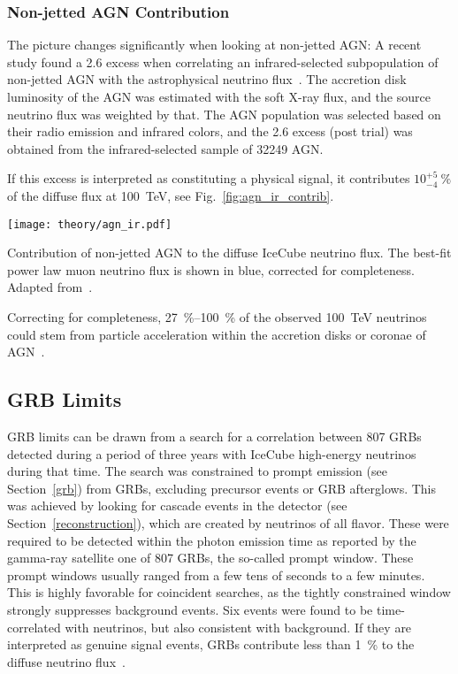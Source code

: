 \subsubsection{Non-jetted AGN Contribution}

The picture changes significantly when looking at non-jetted AGN: A recent study found a \SI{2.6}{\sigma} excess when correlating an infrared-selected subpopulation of non-jetted AGN with the astrophysical neutrino flux~. The accretion disk luminosity of the AGN was estimated with the soft X-ray flux, and the source neutrino flux was weighted by that. The AGN population was selected based on their radio emission and infrared colors, and the \SI{2.6}{\sigma} excess (post trial) was obtained from the infrared-selected sample of 32249 AGN.

If this excess is interpreted as constituting a physical signal, it contributes $10^{+5}_{-4} ~\%$ of the diffuse flux at \SI{100}{\tera\eV}, see Fig.~\ref{fig:agn_ir_contrib}.

\begin{marginfigure}
    \texttt{[image: theory/agn\_ir.pdf]}
    \caption[Non-jetted AGN]{Contribution of non-jetted AGN to the diffuse IceCube neutrino flux. The best-fit power law muon neutrino flux is shown in blue, corrected for completeness. Adapted from~\cite{Abbasi2022c}.}
\end{marginfigure}

Correcting for completeness, \SIrange{27}{100}{\percent} of the observed \SI{100}{\tera\eV} neutrinos could stem from particle acceleration within the accretion disks or coronae of AGN~\cite{Abbasi2022c}.

\subsection{GRB Limits}
GRB limits can be drawn from a search for a correlation between 807 GRBs detected during a period of three years with IceCube high-energy neutrinos during that time. The search was constrained to prompt emission (see Section~\ref{grb}) from GRBs, excluding precursor events or GRB afterglows. This was achieved by looking for cascade events in the detector (see Section~\ref{reconstruction}), which are created by neutrinos of all flavor. These were required to be detected within the photon emission time as reported by the gamma-ray satellite one of 807 GRBs, the so-called prompt window. These prompt windows usually ranged from a few tens of seconds to a few minutes. This is highly favorable for coincident searches, as the tightly constrained window strongly suppresses background events. Six events were found to be time-correlated with neutrinos, but also consistent with background. If they are interpreted as genuine signal events, GRBs contribute less than \SI{1}{\percent} to the diffuse neutrino flux~.

